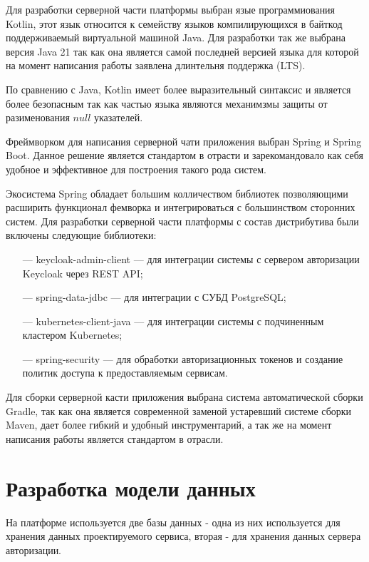 Для разработки серверной части платформы выбран язые программиования Kotlin, этот язык относится к семейству языков компилирующихся в байткод поддерживаемый виртуальной машиной Java. Для разработки так же выбрана версия Java 21 так как она является самой последней версией языка для которой на момент написания работы заявлена длинтельня поддержка (LTS).

По сравнению с Java, Kotlin имеет более выразительный синтаксис и является более безопасным так как частью языка являются механимзмы защиты от разименования $null$ указателей\cite{samuel2017programming}.

Фреймворком для написания серверной чати приложения выбран Spring и Spring Boot.
Данное решение является стандартом в отрасти и зарекомандовало как себя удобное и эффективное для построения такого рода систем.

Экосистема Spring обладает большим колличеством библиотек позволяющими расширить функционал фемворка и интегрироваться с большинством сторонних систем.
Для разработки серверной части платформы с состав дистрибутива были включены следующие библиотеки:

\begin{itemize}
  \item[---] keycloak-admin-client --- для интеграции системы с сервером авторизации Keycloak через REST API;
  \item[---] spring-data-jdbc --- для интеграции с СУБД PostgreSQL;
  \item[---] kubernetes-client-java --- для интеграции системы с подчиненным кластером Kubernetes;
  \item[---] spring-security --- для обработки авторизационных токенов и создание политик доступа к предоставляемым сервисам.
\end{itemize}

Для сборки серверной касти приложения выбрана система автоматической сборки Gradle, так как она является современной заменой устаревший системе сборки Maven, дает более гибкий и удобный инструментарий, а так же на момент написания работы является стандартом в отрасли. 

\section{Разработка модели данных}

На платформе используется две базы данных - одна из них используется для хранения данных проектируемого сервиса, вторая - для хранения данных сервера авторизации.

